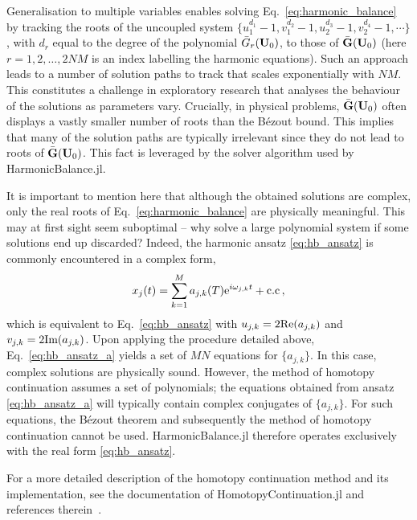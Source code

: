 Generalisation to multiple variables enables solving Eq.~\eqref{eq:harmonic_balance} by tracking the roots of the uncoupled system  $\{u_1^{d_1} - 1,v_1^{d_2} - 1,u_2^{d_3} - 1,v_2^{d_4} - 1,\cdots\}$, with $d_r$ equal to the degree of the polynomial $\bar{G}_r(\vb{U}_0)$, to those of $\bar{\vb{G}}(\vb{U}_0)$ (here $r=1,2,\ldots,2NM$ is an index labelling the harmonic equations). Such an approach leads to a number of solution paths to track that scales exponentially with $NM$. This constitutes a challenge in exploratory research that analyses the behaviour of the solutions as parameters vary. Crucially, in physical problems, $\bar{\vb{G}}(\vb{U}_0)$ often displays a vastly smaller number of roots than the B\'{e}zout bound. This implies that many of the solution paths are typically irrelevant since they do not lead to roots of $\bar{\vb{G}}(\vb{U}_0)$. This fact is leveraged by the solver algorithm used by HarmonicBalance.jl. 

It is important to mention here that although the obtained solutions are complex, only the real roots of Eq.~\eqref{eq:harmonic_balance} are physically meaningful. This may at first sight seem suboptimal -- why solve a large polynomial system if some solutions end up discarded? Indeed, the harmonic ansatz \eqref{eq:hb_ansatz} is commonly encountered in a complex form,
\begin{equation} \label{eq:hb_ansatz_a}
x_j(t) = \sum_{k=1}^M a_{j,k}(T) {\rm e}^{i \omega_{j,k} t } + \text{c.c} \,,
\end{equation} 
which is equivalent to Eq.~\eqref{eq:hb_ansatz} with $u_{j,k} = 2 \text{Re} (a_{j,k})$ and $v_{j,k} = 2 \text{Im} (a_{j,k})$. Upon applying the procedure detailed above, Eq.~\eqref{eq:hb_ansatz_a} yields a set of $MN$ equations for $\{ a_{j,k}\}$. In this case, complex solutions are physically sound. However, the method of homotopy continuation assumes a set of polynomials; the equations obtained from ansatz \eqref{eq:hb_ansatz_a} will typically contain complex conjugates of $\{ a_{j,k}\}$. For such equations, the B\'{e}zout theorem and subsequently the method of homotopy continuation cannot be used. HarmonicBalance.jl therefore operates exclusively with the real form \eqref{eq:hb_ansatz}.  

For a more detailed description of the homotopy continuation method and its implementation, see the documentation of HomotopyContinuation.jl and references therein~\cite{Sommese2005,Breiding_2018,timme2021numerical}. 

